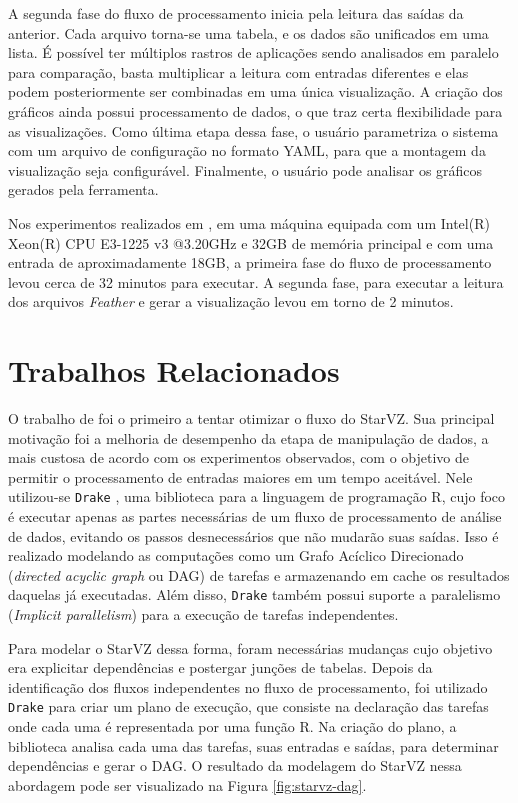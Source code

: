 A segunda fase do fluxo de processamento inicia pela leitura das saídas da 
anterior. Cada arquivo torna-se uma tabela, e os dados são unificados em uma 
lista. É possível ter múltiplos rastros de aplicações sendo analisados em 
paralelo para comparação, basta multiplicar a leitura com entradas diferentes e 
elas podem posteriormente ser combinadas em uma única visualização. A criação 
dos gráficos ainda possui processamento de dados, o que traz certa flexibilidade 
para as visualizações. Como última etapa dessa fase, o usuário parametriza o 
sistema com um arquivo de configuração no formato YAML, para que a montagem da 
visualização seja configurável. Finalmente, o usuário pode analisar os gráficos 
gerados pela ferramenta.

Nos experimentos realizados em \citet{ref:starvz}, em uma máquina equipada com 
um Intel(R) Xeon(R) CPU E3-1225 v3 @3.20GHz e 32GB de memória principal e com 
uma entrada de aproximadamente 18GB, a primeira fase do fluxo de processamento 
levou cerca de 32 minutos para executar. A segunda fase, para executar a leitura 
dos arquivos \textit{Feather} e gerar a visualização levou em torno de 2 
minutos.

\section{Trabalhos Relacionados}\label{sect:related-work}

O trabalho de \citet{ref:drakestarvz} foi o primeiro a tentar otimizar o fluxo 
do StarVZ. Sua principal motivação foi a melhoria de desempenho da etapa de 
manipulação de dados, a mais custosa de acordo com os experimentos observados, 
com o objetivo de permitir o processamento de entradas maiores em um tempo 
aceitável. Nele utilizou-se \texttt{Drake} \cite{ref:drake}, uma biblioteca 
para a linguagem de programação R, cujo foco é executar apenas as 
partes necessárias de um fluxo de processamento de análise de dados, evitando 
os passos desnecessários que não mudarão suas saídas. Isso é realizado 
modelando as computações como um Grafo Acíclico Direcionado (\textit{directed 
acyclic graph} ou DAG) de tarefas e armazenando em cache os resultados daquelas 
já executadas. Além disso, \texttt{Drake} também possui suporte a paralelismo 
(\textit{Implicit parallelism}) para a execução de tarefas independentes.

Para modelar o StarVZ dessa forma, foram necessárias mudanças cujo objetivo era 
explicitar dependências e postergar junções de tabelas. Depois da identificação 
dos fluxos independentes no fluxo de processamento, foi utilizado \texttt{Drake} 
para criar um plano de execução, que consiste na declaração das tarefas onde 
cada uma é representada por uma função R. Na criação do plano, a biblioteca 
analisa cada uma das tarefas, suas entradas e saídas, para determinar 
dependências e gerar o DAG. O resultado da modelagem do StarVZ nessa abordagem 
pode ser visualizado na Figura \ref{fig:starvz-dag}.


